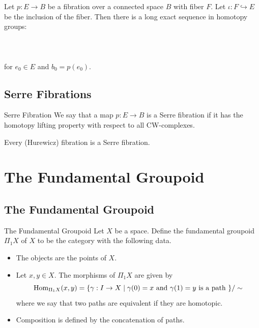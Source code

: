 \documentclass[a4paper]{article}
\begin{document}
\begin{thm}{}{} Let $p:E\to B$ be a fibration over a connected space $B$ with fiber $F$. Let $\iota:F\hookrightarrow E$ be the inclusion of the fiber. Then there is a long exact sequence in homotopy groups: \\~\\
\\~\\
for $e_0\in E$ and $b_0=p(e_0)$. 
\end{thm}

\subsection{Serre Fibrations}
\begin{defn}{Serre Fibration}{} We say that a map $p:E\to B$ is a Serre fibration if it has the homotopy lifting property with respect to all CW-complexes. 
\end{defn}

\begin{prp}{}{} Every (Hurewicz) fibration is a Serre fibration. 
\end{prp}

\pagebreak
\section{The Fundamental Groupoid}
\subsection{The Fundamental Groupoid}
\begin{defn}{The Fundamental Groupoid}{} Let $X$ be a space. Define the fundamental groupoid $\Pi_1X$ of $X$ to be the category with the following data. 
\begin{itemize}
\item The objects are the points of $X$. 
\item Let $x,y\in X$. The morphisms of $\Pi_1X$ are given by $$\operatorname{Hom}_{\Pi_1X}(x,y)=\{\gamma:I\to X\;|\;\gamma(0)=x\text{ and }\gamma(1)=y\text{ is a path }\}/\sim$$ where we say that two paths are equivalent if they are homotopic. 
\item Composition is defined by the concatenation of paths. 
\end{itemize}
\end{defn}
\end{document}
